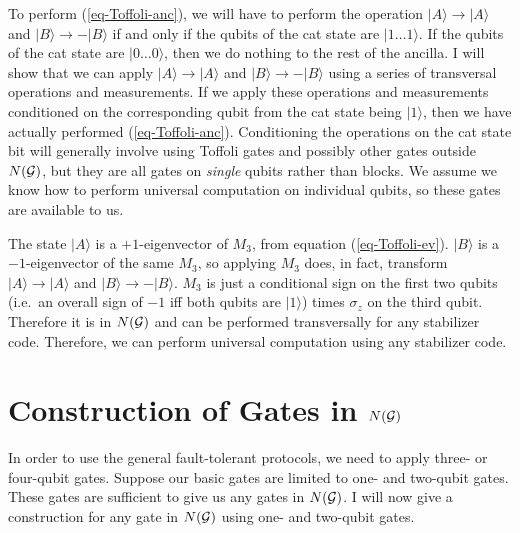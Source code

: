 \documentclass{report}
\newcommand{\G}{{\cal G}}
\newcommand{\ket}[1]{|{#1}\rangle}
\newcommand{\Z}{\sigma_z}
\begin{document}
To perform (\ref{eq-Toffoli-anc}), we will have to perform the operation 
$\ket{A} \rightarrow \ket{A}$ and $\ket{B} \rightarrow - \ket{B}$ if and
only if the
qubits of the cat state are $\ket{1 \ldots 1}$.  If the qubits of the cat state 
are $\ket{0 \ldots 0}$, then we do nothing to the rest of the ancilla.  I will 
show that we can apply $\ket{A} \rightarrow \ket{A}$ and $\ket{B} 
\rightarrow - \ket{B}$ using a series of transversal operations and 
measurements.  If we apply these operations and measurements 
conditioned on the corresponding qubit from the cat state being $\ket{1}$, 
then we have actually performed (\ref{eq-Toffoli-anc}).  Conditioning the 
operations on the cat state bit will generally involve using Toffoli gates and 
possibly other gates outside $N(\G)$, but they are all gates on {\em single} 
qubits rather than blocks.  We assume we know how to perform universal 
computation on individual qubits, so these gates are available to us.

The state $\ket{A}$ is a $+1$-eigenvector of $M_3$, from equation 
(\ref{eq-Toffoli-ev}).  $\ket{B}$ is a $-1$-eigenvector of the same $M_3$, 
so applying $M_3$ does, in fact, transform $\ket{A} \rightarrow \ket{A}$ 
and $\ket{B} \rightarrow - \ket{B}$.  $M_3$ is just a conditional sign on 
the first two qubits (i.e.\ an overall sign of $-1$ iff both qubits are 
$\ket{1}$) times $\Z$ on the third qubit.  Therefore it is in $N(\G)$ and 
can be performed transversally for any stabilizer code.  Therefore, we can 
perform universal computation using any stabilizer code.

\section{Construction of Gates in $N(\G)$}

In order to use the general fault-tolerant protocols, we need to apply 
three- or four-qubit gates.  Suppose our basic gates are limited to one- and 
two-qubit gates.  These gates are sufficient to give us any gates in $N(\G)$.  
I will now give a construction for any gate in $N(\G)$ using one- and 
two-qubit gates.
\end{document}
